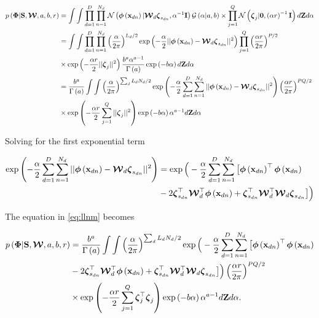 	
	
	\begin{align}
	p\left(\boldsymbol{\Phi}|\Scluster,\W,a,b,r\right) &=  \int \int \prod_{d=1}^{D}\prod_{n=1}^{N_d}{\gD{\phixnd|\projMat \lvecs}{\alpha^{-1}\eye}\catD{\alpha|a}{b}} \times \prod_{j=1}^{Q}\gD{\lvec|\mathbf{0}}{\left(\alpha r\right)^{-1}\eye}d\Z d\alpha  \notag \\
	&=\int \int \prod_{d=1}^{D}\prod_{n=1}^{N_d}\left(\frac{\alpha}{2\pi}\right)^{L_d /2}\exp\left(-\frac{\alpha}{2}||\phixnd-\projMat\lvecs||^2\right) \prod_{j=1}^{Q}\left(\frac{\alpha r}{2\pi}\right)^{P/2} \notag \\
	&\times \exp\left(-\frac{\alpha r}{2}||\lvec||^2\right)\frac{b^a \alpha^{a-1}}{\gammaA}\exp\left(-b\alpha\right)d\Z d\alpha \notag\\
	&=\frac{b^a}{\gammaA}\int \int \left(\frac{\alpha}{2\pi}\right)^{\sum_d L_d N_d /2}\exp\left(-\frac{\alpha}{2} \sum_{d=1}^{D}\sum_{n=1}^{N_d}||\phixnd-\projMat\lvecs||^2\right)\left(\frac{\alpha r}{2\pi}\right)^{PQ/2} \notag \\
	&\times \exp\left(-\frac{\alpha r}{2} \sum_{j=1}^{Q}||\lvec||^2\right)\exp\left(-b\alpha\right)\alpha^{a-1}d\Z d\alpha 
	\label{eq:llnm}
	\end{align}
	
	Solving for the first exponential term
	
	\begin{align}
	\exp\left(-\frac{\alpha}{2} \sum_{d=1}^{D}\sum_{n=1}^{N_d}||\phixnd-\projMat\lvecs||^2\right) &= \exp\Big(-\frac{\alpha}{2} \sum_{d=1}^{D}\sum_{n=1}^{N_d}\big[ \phixnd^\top \phixnd  \notag\\
	&  - 2 \lvecs ^\top \projMat^\top \phixnd + \lvecs^\top \projMat^\top \projMat \lvecs \big]\Big) \notag\\
	\label{eq:exp_XWz}
	\end{align}
	
	The equation in \eqref{eq:llnm} becomes
	
	\begin{align}
	p\left(\boldsymbol{\Phi}|\Scluster,\W,a,b,r\right) &= \frac{b^a}{\gammaA}\int \int \left(\frac{\alpha}{2\pi}\right)^{\sum_d L_d N_d /2}\exp\Big(-\frac{\alpha}{2} \sum_{d=1}^{D}\sum_{n=1}^{N_d}\big[  \phixnd^\top \phixnd   \notag\\
	&  - 2 \lvecs ^\top \projMat^\top \phixnd + \lvecs^\top \projMat^\top \projMat \lvecs \big]\Big)\left(\frac{\alpha r}{2\pi}\right)^{PQ/2} \notag \\
	&\times \exp\left(-\frac{\alpha r}{2} \sum_{j=1}^{Q}\lvec^\top\lvec\right)\exp\left(-b\alpha\right)\alpha^{a-1}d\Z d\alpha.
	\label{eq:llnm2}
	\end{align}
	
